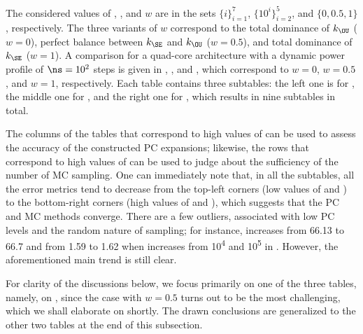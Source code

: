 The considered values of \lc, \no, and $w$ are in the sets $\{ i \}_{i = 1}^7$,
$\{ 10^i \}_{i = 2}^5$, and $\{ 0, 0.5, 1 \}$, respectively. The three variants
of $w$ correspond to the total dominance of $k_\OU$ ($w = 0$), perfect balance
between $k_\SE$ and $k_\OU$ ($w = 0.5$), and total dominance of $k_\SE$ ($w =
1$). A comparison for a quad-core architecture with a dynamic power profile of
$\ns = 10^2$ steps is given in ,
, and ,
which correspond to $w = 0$, $w = 0.5$, and $w = 1$, respectively. Each table
contains three subtables: the left one is for \error{\expectation}, the middle
one for \error{\variance}, and the right one for , which results in
nine subtables in total.

The columns of the tables that correspond to high values of \no can be used to
assess the accuracy of the constructed \ac{PC} expansions; likewise, the rows
that correspond to high values of \lc can be used to judge about the sufficiency
of the number of \ac{MC} sampling. One can immediately note that, in all the
subtables, all the error metrics tend to decrease from the top-left corners (low
values of \lc and \no) to the bottom-right corners (high values of \lc and \no),
which suggests that the \ac{PC} and \ac{MC} methods converge. There are a few
outliers, associated with low \ac{PC} levels and the random nature of sampling;
for instance, \error{\variance} increases from 66.13 to 66.7 and  from
1.59 to 1.62 when \no increases from 10\textsuperscript{4} and
10\textsuperscript{5} in . However, the
aforementioned main trend is still clear.

For clarity of the discussions below, we focus primarily on one of the three
tables, namely, on , since the case with $w =
0.5$ turns out to be the most challenging, which we shall elaborate on shortly.
The drawn conclusions are generalized to the other two tables at the end of this
subsection.

